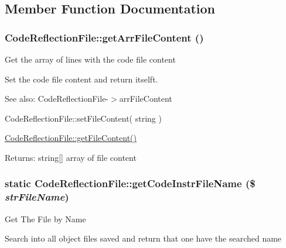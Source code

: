 \subsection{Member Function Documentation}
\hypertarget{class_code_reflection_file_1c6e129f863511fd326ccf7a13d64c5a}{
\subsubsection[{getArrFileContent}]{\setlength{\rightskip}{0pt plus 5cm}CodeReflectionFile::getArrFileContent ()}}
\label{class_code_reflection_file_1c6e129f863511fd326ccf7a13d64c5a}


Get the array of lines with the code file content

Set the code file content and return itselft.

\begin{Desc}
\item[See also:]CodeReflectionFile-$>$arrFileContent 

CodeReflectionFile::setFileContent( string ) 

\hyperlink{class_code_reflection_file_f87150d5f818f1b92d30db63dfdf966a}{CodeReflectionFile::getFileContent()} \end{Desc}
\begin{Desc}
\item[Returns:]string\mbox{[}\mbox{]} array of file content \end{Desc}
\hypertarget{class_code_reflection_file_43822c529c08e8f126ab454b209fc31f}{
\subsubsection[{getCodeInstrFileName}]{\setlength{\rightskip}{0pt plus 5cm}static CodeReflectionFile::getCodeInstrFileName (\$ {\em strFileName})}}
\label{class_code_reflection_file_43822c529c08e8f126ab454b209fc31f}


Get The File by Name

Search into all object files saved and return that one have the searched name

